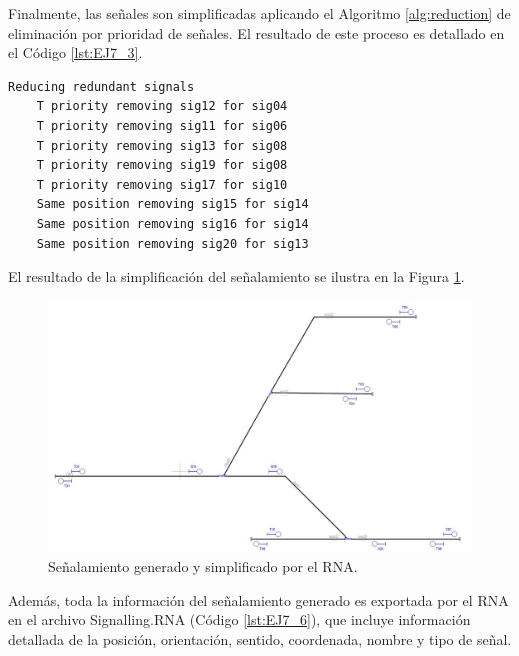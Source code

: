 	Finalmente, las señales son simplificadas aplicando el Algoritmo \ref{alg:reduction} de eliminación por prioridad de señales. El resultado de este proceso es detallado en el Código \ref{lst:EJ7_3}.
	
	\begin{lstlisting}[language = {}, caption = Reducción de señalamiento por prioridad de señales, label = {lst:EJ7_3}]
	Reducing redundant signals
	T priority removing sig12 for sig04
	T priority removing sig11 for sig06
	T priority removing sig13 for sig08
	T priority removing sig19 for sig08
	T priority removing sig17 for sig10
	Same position removing sig15 for sig14
	Same position removing sig16 for sig14
	Same position removing sig20 for sig13
	\end{lstlisting}
	
	El resultado de la simplificación del señalamiento se ilustra en la Figura \ref{fig:EJ7_7}.
	
	\begin{figure}[H]
		\centering
		\includegraphics[width=1\textwidth]{resultados-obtenidos/ejemplo7/images/7_RNA.png}
		\centering\caption{Señalamiento generado y simplificado por el RNA.}
		\label{fig:EJ7_7}
	\end{figure}
	
	Además, toda la información del señalamiento generado es exportada por el RNA en el archivo Signalling.RNA (Código \ref{lst:EJ7_6}), que incluye información detallada de la posición, orientación, sentido, coordenada, nombre y tipo de señal.
	
